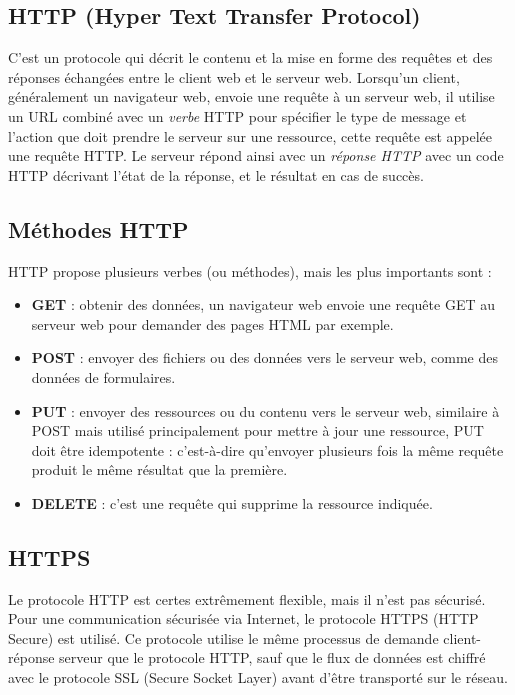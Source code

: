 \subsection{HTTP (Hyper Text Transfer Protocol)}
C'est un protocole qui décrit le contenu et la mise en forme des requêtes et des réponses échangées entre le client web et le serveur web. 
Lorsqu'un client, généralement un navigateur web, envoie une requête à un serveur web, il utilise un URL combiné avec un \emph{verbe} HTTP pour spécifier le type de message et l'action que doit prendre le serveur sur une ressource, cette requête est appelée une requête HTTP. Le serveur répond ainsi avec un \emph{réponse HTTP} avec un code HTTP décrivant l'état de la réponse, et le résultat en cas de succès.

\subsection{Méthodes HTTP}
HTTP propose plusieurs verbes (ou méthodes), mais les plus importants sont : 
\begin{itemize}
	\item \textbf{GET} : obtenir des données, un navigateur web envoie une requête GET au serveur web pour demander des pages HTML par exemple.
	\item \textbf{POST} : envoyer des fichiers ou des données vers le serveur web, comme des données de formulaires.
	\item \textbf{PUT} : envoyer des ressources ou du contenu vers le serveur web, similaire à POST mais utilisé principalement pour mettre à jour une ressource, PUT doit être idempotente : c'est-à-dire qu'envoyer plusieurs fois la même requête produit le même résultat que la première.
	\item \textbf{DELETE} : c'est une requête  qui supprime la ressource indiquée.
\end{itemize}

\subsection{HTTPS}
Le protocole HTTP est certes extrêmement flexible, mais il n'est pas sécurisé.
Pour une communication sécurisée via Internet, le protocole HTTPS (HTTP Secure) est utilisé. \newline
Ce protocole utilise le même processus de demande client-réponse serveur que le protocole HTTP, sauf que le flux de données est chiffré avec le protocole SSL (Secure Socket Layer) avant d'être transporté sur le réseau.

